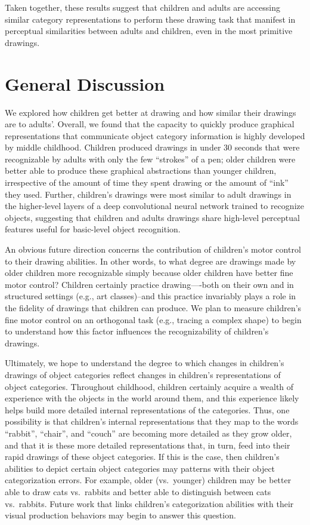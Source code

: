 \documentclass[10pt, letterpaper]{article}
\begin{document}
Taken together, these results suggest that children and adults are
accessing similar category representations to perform these drawing task
that manifest in perceptual similarities between adults and children,
even in the most primitive drawings.

\section{General Discussion}\label{general-discussion}

We explored how children get better at drawing and how similar their
drawings are to adults'. Overall, we found that the capacity to quickly
produce graphical representations that communicate object category
information is highly developed by middle childhood. Children produced
drawings in under 30 seconds that were recognizable by adults with only
the few ``strokes'' of a pen; older children were better able to produce
these graphical abstractions than younger children, irrespective of the
amount of time they spent drawing or the amount of ``ink'' they used.
Further, children's drawings were most similar to adult drawings in the
higher-level layers of a deep convolutional neural network trained to
recognize objects, suggesting that children and adults drawings share
high-level perceptual features useful for basic-level object
recognition.

An obvious future direction concerns the contribution of children's
motor control to their drawing abilities. In other words, to what degree
are drawings made by older children more recognizable simply because
older children have better fine motor control? Children certainly
practice drawing----both on their own and in structured settings (e.g.,
art classes)--and this practice invariably plays a role in the fidelity
of drawings that children can produce. We plan to measure children's
fine motor control on an orthogonal task (e.g., tracing a complex shape)
to begin to understand how this factor influences the recognizability of
children's drawings.

Ultimately, we hope to understand the degree to which changes in
children's drawings of object categories reflect changes in children's
representations of object categories. Throughout childhood, children
certainly acquire a wealth of experience with the objects in the world
around them, and this experience likely helps build more detailed
internal representations of the categories. Thus, one possibility is
that children's internal representations that they map to the words
``rabbit'', ``chair'', and ``couch'' are becoming more detailed as they
grow older, and that it is these more detailed representations that, in
turn, feed into their rapid drawings of these object categories. If this
is the case, then children's abilities to depict certain object
categories may patterns with their object categorization errors. For
example, older (vs.~younger) children may be better able to draw cats
vs.~rabbits and better able to distinguish between cats vs.~rabbits.
Future work that links children's categorization abilities with their
visual production behaviors may begin to answer this question.
\end{document}
